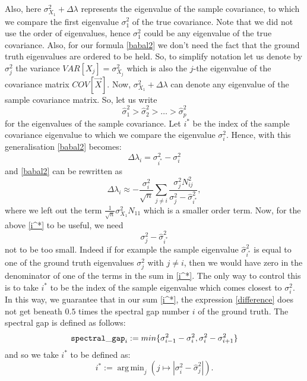 \documentclass[12pt]{amsart}
\theoremstyle{definition}
\numberwithin{equation}{section}
\numberwithin{equation}{section}
\theoremstyle{remark}
\numberwithin{equation}{section}
\DeclareMathOperator*{\argmin}{arg\,min}
\begin{document}
Also, here $\sigma_{X_1}^2+\Delta\lambda$ represents the eigenvalue of the sample covariance, to which we compare
the first eigenvalue $\sigma_1^2$ of the true covariance. Note that we did not use the order of eigenvalues,
hence $\sigma_1^2$ could be any eigenvalue of the true covariance.
Also, for our formula \ref{babal2} we don't need the fact that the ground truth eigenvalues are ordered to be held. So, to simplify notation let us denote by $\sigma^2_j$ the variance $VAR[X_j]=\sigma^2_{X_j}$ which is also the $j$-the eigenvalue of the covariance matrix
$COV[\vec{X}]$. Now, $\sigma_{X_1}^2+\Delta\lambda$ can denote any eigenvalue of the sample covariance matrix. So, let
us write $$\hat{\sigma}^2_1>\hat{\sigma}^2_2>\ldots>\hat{\sigma}^2_p$$
for the eigenvalues of the sample covariance.
Let $i^*$ be the index of the sample covariance eigenvalue to which we compare the eigenvalue $\sigma^2_i$.
Hence, with this generalisation \ref{babal2} becomes:
\begin{equation}
\label{Deltalambda_2}
\Delta\lambda_i=\sigma^2_{i^*} -\sigma^2_{i}
\end{equation}
and \ref{babal2} can be rewritten as
\begin{equation}
\label{i^*}
\Delta\lambda_i\approx-
\frac{\sigma _i^2}{\sqrt{n}}\sum_{j\neq i}\frac{\sigma_{j}^2 N_{ij}^2}{\sigma_{j}^2-\hat{\sigma}^2_{i^*}},
\end{equation}
where we left out the term  $\frac{1}{\sqrt{n}}\sigma^{2}_{X_1} N_{11}$ which is a smaller order term.
Now, for the above \ref{i^*} to be useful, we need
 \begin{equation}
 \label{difference}
 \sigma_{j}^2-\hat{\sigma}^2_{i^*}
 \end{equation}
not to be too small.
Indeed if for example  the sample eigenvalue $\hat{\sigma}^2_{i^*}$ is equal to one of the ground truth eigenvalues $\sigma^2_j$ with $j\neq i$,
then we would have zero in the denominator of one of the terms in the sum in \ref{i^*}. The only way to control this is to take $i^*$ to be the index
of the sample eigenvalue which comes closest to $\sigma^2_i$. In this way, we guarantee that in our sum \ref{i^*}, the expression \ref{difference} does not get beneath $0.5$ times the spectral gap number $i$ of the ground truth.
The spectral gap is defined as follows:
\begin{equation}
\label{spectral_gap}
{\tt spectral\_ gap}_i:=min\{\sigma^2_{i-1}-\sigma^2_i,\sigma^2_{i}-\sigma^2_{i+1}\}
\end{equation}
and so we take $i^*$ to be defined as:
\begin{equation}
\label{deffi*}
i^*:=\argmin_j(j\mapsto|\sigma_i^2-\hat{\sigma}^2_j|).
	\end{equation}
\end{document}
